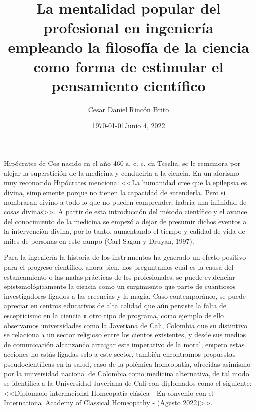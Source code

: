 \documentclass[letterpaper,12pt]{article}
\begin{document}
\title{La mentalidad popular del profesional en ingeniería empleando la filosofía de la ciencia como forma de estimular el pensamiento científico}
\author{\normalsize{Cesar Daniel Rincón Brito}}
\date{\normalsize{\today}}
\date{\normalsize{Junio 4, 2022}}
\maketitle

\thispagestyle{empty}
\pagestyle{empty}

Hipócrates de Cos nacido en el año 460 a. e. c. en Tesalia, se le rememora por alejar la superstición de la medicina y conducirla a la ciencia. En un aforismo muy reconocido Hipócrates menciona: <<La humanidad cree que la epilepsia es divina, simplemente porque no tienen la capacidad de entenderla. Pero si nombraran divino a todo lo que no pueden comprender, habría una infinidad de cosas divinas>>.  A partir de esta introducción del método científico y el avance del conocimiento de la medicina se empezó a dejar de presumir dichos eventos a la intervención divina, por lo tanto, aumentando el tiempo y calidad de vida de miles de personas en este campo (Carl Sagan y Druyan, 1997).
\newline %

Para la ingeniería la historia de los instrumentos ha generado un efecto positivo para el progreso científico, ahora bien, nos preguntamos cuál es la causa del estancamiento o las malas prácticas de los profesionales, se puede evidenciar epistemológicamente la ciencia como un surgimiento que parte de cuantiosos investigadores ligados a las creencias y la magia. Caso contemporáneo, se puede apreciar en centros educativos de alta calidad que aún persiste la falta de escepticismo en la ciencia u otro tipo de programa, como ejemplo de ello observamos universidades como la Javeriana de Cali, Colombia que su distintivo se relaciona a un sector religioso entre los cientos existentes, y desde sus medios de comunicación alcanzando arraigar este imperativo de la moral, empero estas acciones no estás ligadas solo a este sector, también encontramos propuestas pseudocientíficas en la salud, caso de la polémica homeopatía, ofrecidas asimismo por la universidad nacional de Colombia como medicina alternativa, de tal modo se identifica a la Universidad Javeriana de Cali con diplomados como el siguiente: <<Diplomado internacional Homeopatía clásica - En convenio con el International Academy of Classical Homeopathy - (Agosto 2022)>>.
\newline %
\end{document}
